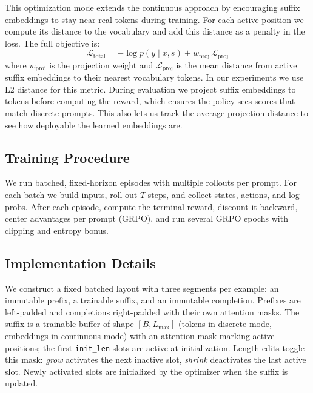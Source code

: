 \documentclass[11pt]{article}
\begin{document}
This optimization mode extends the continuous approach by encouraging suffix embeddings to stay near real tokens during training. For each active position we compute its distance to the vocabulary and add this distance as a penalty in the loss. The full objective is:
\begin{equation}
  \mathcal{L}_{\text{total}} = -\log p(y\mid x,s) + w_{\text{proj}}\,\mathcal{L}_{\text{proj}}
  \label{eq:continuous_proj_loss}
\end{equation}
where $w_{\text{proj}}$ is the projection weight and $\mathcal{L}_{\text{proj}}$ is the mean distance from active suffix embeddings to their nearest vocabulary tokens. In our experiments we use L2 distance for this metric. During evaluation we project suffix embeddings to tokens before computing the reward, which ensures the policy sees scores that match discrete prompts. This also lets us track the average projection distance to see how deployable the learned embeddings are.


\subsection{Training Procedure}
\label{subsec:training}

We run batched, fixed-horizon episodes with multiple rollouts per prompt. For each batch we build inputs, roll out \(T\) steps, and collect states, actions, and log-probs. After each episode, compute the terminal reward, discount it backward, center advantages per prompt (GRPO), and run several GRPO epochs with clipping and entropy bonus.

\subsection{Implementation Details}
\label{subsec:implementation}

We construct a fixed batched layout with three segments per example: an immutable prefix, a trainable suffix, and an immutable completion. Prefixes are left-padded and completions right-padded with their own attention masks. The suffix is a trainable buffer of shape \([B, L_{\max}]\) (tokens in discrete mode, embeddings in continuous mode) with an attention mask marking active positions; the first \texttt{init\_len} slots are active at initialization. Length edits toggle this mask: \textit{grow} activates the next inactive slot, \textit{shrink} deactivates the last active slot. Newly activated slots are initialized by the optimizer when the suffix is updated.
\end{document}
